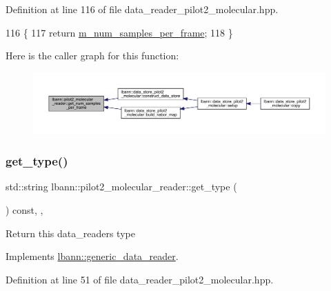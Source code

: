 Definition at line 116 of file data\+\_\+reader\+\_\+pilot2\+\_\+molecular.\+hpp.


\begin{DoxyCode}
116                                         \{
117     \textcolor{keywordflow}{return} \hyperlink{classlbann_1_1pilot2__molecular__reader_a1aa5896276d8a0576f7b3c2b955130be}{m\_num\_samples\_per\_frame};
118   \}
\end{DoxyCode}
Here is the caller graph for this function\+:\nopagebreak
\begin{figure}[H]
\begin{center}
\leavevmode
\includegraphics[width=350pt]{classlbann_1_1pilot2__molecular__reader_a91e233f9878e93e31de2085cbcad1f10_icgraph}
\end{center}
\end{figure}
\mbox{\label{classlbann_1_1pilot2__molecular__reader_a8548d10554c6e1ef921cf5d113530e72}} 
\subsubsection{\texorpdfstring{get\+\_\+type()}{get\_type()}}
{\footnotesize\ttfamily std\+::string lbann\+::pilot2\+\_\+molecular\+\_\+reader\+::get\+\_\+type (\begin{DoxyParamCaption}{ }\end{DoxyParamCaption}) const\hspace{0.3cm}{\ttfamily [inline]}, {\ttfamily [override]}, {\ttfamily [virtual]}}

Return this data\+\_\+reader\textquotesingle{}s type 

Implements \hyperlink{classlbann_1_1generic__data__reader_abeb849fb8e10b4fa317c90bc33f61758}{lbann\+::generic\+\_\+data\+\_\+reader}.



Definition at line 51 of file data\+\_\+reader\+\_\+pilot2\+\_\+molecular.\+hpp.


